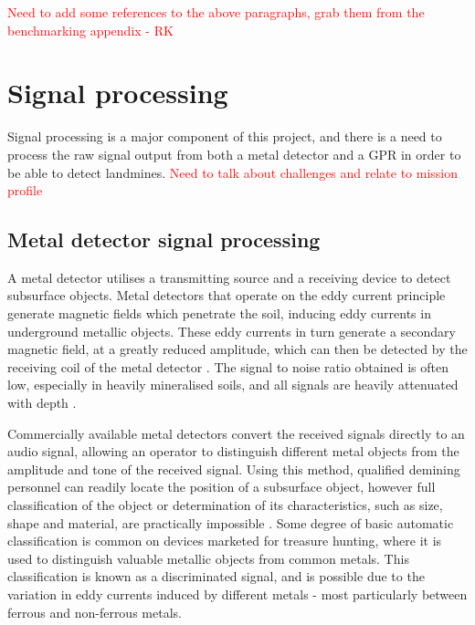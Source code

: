\documentclass[main.tex]{subfiles}
\begin{document}
\textcolor{red}{Need to add some references to the above paragraphs, grab them from the benchmarking appendix - RK}

\section{Signal processing}
Signal processing is a major component of this project, and there is a need to process the raw signal output from both a metal detector and a GPR in order to  be able to detect landmines. \textcolor{red}{Need to talk about challenges and relate to mission profile}

\subsection{Metal detector signal processing}
A metal detector utilises a transmitting source and a receiving device to detect subsurface objects. Metal detectors that operate on the eddy current principle generate magnetic fields which penetrate the soil, inducing eddy currents in underground metallic objects. These eddy currents in turn generate a secondary magnetic field, at a greatly reduced amplitude, which can then be detected by the receiving coil of the metal detector \parencite{Candy2008}. The signal to noise ratio obtained is often low, especially in heavily mineralised soils, and all signals are heavily attenuated with depth \parencite{Candy2008}.

Commercially available metal detectors convert the received signals directly to an audio signal, allowing an operator to distinguish different metal objects from the amplitude and tone of the received signal. Using this method, qualified demining personnel can readily locate the position of a subsurface object, however full classification of the object or determination of its characteristics, such as size, shape and material, are practically impossible \parencite{Kruger2006}. Some degree of basic automatic classification is common on devices marketed for treasure hunting, where it is used to distinguish valuable metallic objects from common metals. This classification is known as a discriminated signal, and is possible due to the variation in eddy currents induced by different metals - most particularly between ferrous and non-ferrous metals. 
\end{document}

